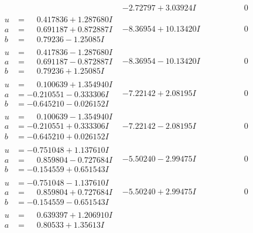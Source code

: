 \documentclass[1p]{elsarticle_modified}
\theoremstyle{definition}
\begin{document}
$$\begin{array}{c|c|c}
 & -2.72797 + 3.03924 I & \phantom{-0.000000 } 0 \\ \hline\begin{aligned}
u &= \phantom{-}0.417836 + 1.287680 I \\
a &= \phantom{-}0.691187 + 0.872887 I \\
b &= \phantom{-}0.79236 - 1.25085 I\end{aligned}
 & -8.36954 + 10.13420 I & \phantom{-0.000000 } 0 \\ \hline\begin{aligned}
u &= \phantom{-}0.417836 - 1.287680 I \\
a &= \phantom{-}0.691187 - 0.872887 I \\
b &= \phantom{-}0.79236 + 1.25085 I\end{aligned}
 & -8.36954 - 10.13420 I & \phantom{-0.000000 } 0 \\ \hline\begin{aligned}
u &= \phantom{-}0.100639 + 1.354940 I \\
a &= -0.210551 - 0.333306 I \\
b &= -0.645210 - 0.026152 I\end{aligned}
 & -7.22142 + 2.08195 I & \phantom{-0.000000 } 0 \\ \hline\begin{aligned}
u &= \phantom{-}0.100639 - 1.354940 I \\
a &= -0.210551 + 0.333306 I \\
b &= -0.645210 + 0.026152 I\end{aligned}
 & -7.22142 - 2.08195 I & \phantom{-0.000000 } 0 \\ \hline\begin{aligned}
u &= -0.751048 + 1.137610 I \\
a &= \phantom{-}0.859804 - 0.727684 I \\
b &= -0.154559 + 0.651543 I\end{aligned}
 & -5.50240 - 2.99475 I & \phantom{-0.000000 } 0 \\ \hline\begin{aligned}
u &= -0.751048 - 1.137610 I \\
a &= \phantom{-}0.859804 + 0.727684 I \\
b &= -0.154559 - 0.651543 I\end{aligned}
 & -5.50240 + 2.99475 I & \phantom{-0.000000 } 0 \\ \hline\begin{aligned}
u &= \phantom{-}0.639397 + 1.206910 I \\
a &= \phantom{-}0.80533 + 1.35613 I \\

\end{aligned}
\end{array}$$
\end{document}
